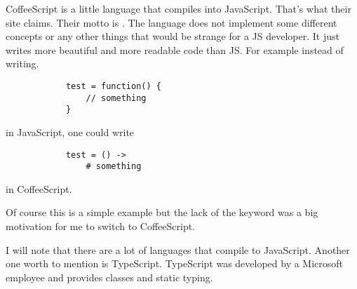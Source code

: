             CoffeeScript is a little language that compiles into JavaScript. 
            That's what their site claims. 
            Their motto is . 
            The language does not implement some different concepts or any other things that would be strange for a JS developer. 
            It just writes more beautiful and more readable code than JS. 
            For example instead of writing.
            \begin{lstlisting}
            test = function() {
                // something
            }
            \end{lstlisting}
            in JavaScript, one could write
            \begin{lstlisting}
            test = () ->
                # something
            \end{lstlisting}
            in CoffeeScript.

            Of course this is a simple example but the lack of the  keyword was a big motivation for me to switch to CoffeeScript.

            I will note that there are a lot of languages that compile to JavaScript. Another one worth to mention is TypeScript. TypeScript was developed by a Microsoft employee and provides classes and static typing. 
